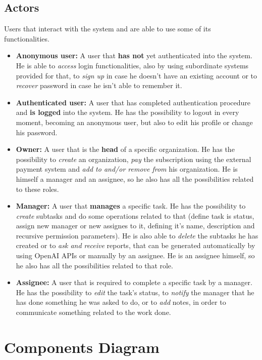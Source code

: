 \documentclass{article}
\begin{document}
\subsection{Actors}
Users that interact with the system and are able to use some of its functionalities.
\begin{itemize}
    \item \textbf{Anonymous user:} A user that \textbf{has not} yet authenticated into the system. He is able to \textit{access} login functionalities, also by using subordinate systems provided for that, to \textit{sign up} in case he doesn't have an existing account or to \textit{recover} password in case he isn't able to remember it.
    \item \textbf{Authenticated user:} A user that has completed authentication procedure and \textbf{is logged} into the system. He has the possibility to logout in every moment, becoming an anonymous user, but also to edit his profile or change his password.
    \item \textbf{Owner:} A user that is the \textbf{head} of a specific organization. He has the possibility to \textit{create} an organization, \textit{pay} the subscription using the external payment system and \textit{add to and/or remove from} his organization. He is himself a manager and an assignee, so he also has all the possibilities related to these roles.
    \item \textbf{Manager:} A user that \textbf{manages} a specific task. He has the possibility to \textit{create} subtasks and do some operations related to that (define task is status, assign new manager or new assignes to it, defining it's name, description and recursive permission parameters). He is also able to \textit{delete} the subtasks he has created or to \textit{ask and receive} reports, that can be generated automatically by using OpenAI APIs or manually by an assignee. He is an assignee himself, so he also has all the possibilities related to that role.
    \item \textbf{Assignee:} A user that is required to complete a specific task by a manager. He has the possibility to \textit{edit} the task's status, to \textit{notify} the manager that he has done something he was asked to do, or to \textit{add} notes, in order to communicate something related to the work done.
\end{itemize}

\section{Components Diagram}
\end{document}
